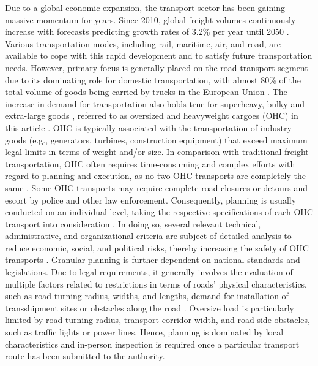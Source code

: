 
Due to a global economic expansion, the transport sector has been gaining massive momentum for years.
Since 2010, global freight volumes continuously increase with forecasts predicting growth rates of 3.2\% per year until 2050 \cite{figura2020preferences, InternationalTransportForum}.
Various transportation modes, including rail, maritime, air, and road, are available to cope with this rapid development and to satisfy future transportation needs.
However, primary focus is generally placed on the road transport segment due to its dominating role for domestic transportation, with almost 80\% of the total volume of goods being carried by trucks in the European Union \cite{Eurostat}.
The increase in demand for transportation also holds true for superheavy, bulky and extra-large goods \cite{gavrilova2021analysis}, referred to as oversized and heavyweight cargoes (OHC) in this article \cite{Luo.2021}.
OHC is typically associated with the transportation of industry goods (e.g., generators, turbines, construction equipment) that exceed maximum legal limits in terms of weight and/or size.
In comparison with traditional freight transportation, OHC often requires time-consuming and complex efforts with regard to planning and execution, as no two OHC transports are completely the same \cite{Wolnowska.2019}.
Some OHC transports may require complete road closures or detours and escort by police and other law enforcement.
Consequently, planning is usually conducted on an individual level, taking the respective specifications of each OHC transport into consideration \cite{Bazaras.2013}.
In doing so, several relevant technical, administrative, and organizational criteria are subject of detailed analysis to reduce economic, social, and political risks, thereby increasing the safety of OHC transports \cite{Palsaitis.2012}.
Granular planning is further dependent on national standards and legislations. Due to legal requirements, it generally involves the evaluation of multiple factors related to restrictions in terms of roads' physical characteristics, such as road turning radius, widths, and lengths, demand for installation of transshipment sites or obstacles along the road \cite{PETRASKA.2018}.
Oversize load is particularly limited by road turning radius, transport corridor width, and road-side obstacles, such as traffic lights or power lines.
Hence, planning is dominated by local characteristics and in-person inspection is required once a particular transport route has been submitted to the authority.
